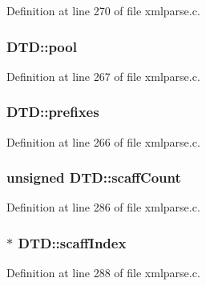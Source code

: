 Definition at line 270 of file xmlparse.\+c.

\subsubsection[{\texorpdfstring{pool}{pool}}]{ D\+T\+D\+::pool}\hypertarget{struct_d_t_d_ab33febd17f0cfde7df39438cabdffa6e}{}\label{struct_d_t_d_ab33febd17f0cfde7df39438cabdffa6e}


Definition at line 267 of file xmlparse.\+c.

\subsubsection[{\texorpdfstring{prefixes}{prefixes}}]{ D\+T\+D\+::prefixes}\hypertarget{struct_d_t_d_ad00dc50e4fb01b3013d902502f6932e3}{}\label{struct_d_t_d_ad00dc50e4fb01b3013d902502f6932e3}


Definition at line 266 of file xmlparse.\+c.

\subsubsection[{\texorpdfstring{scaff\+Count}{scaffCount}}]{\setlength{\rightskip}{0pt plus 5cm}unsigned D\+T\+D\+::scaff\+Count}\hypertarget{struct_d_t_d_af2f963a74af5574dfbb80b3529c023a8}{}\label{struct_d_t_d_af2f963a74af5574dfbb80b3529c023a8}


Definition at line 286 of file xmlparse.\+c.

\subsubsection[{\texorpdfstring{scaff\+Index}{scaffIndex}}]{$\ast$ D\+T\+D\+::scaff\+Index}\hypertarget{struct_d_t_d_a4bc4523f86658647920aaf827eb1ecdd}{}\label{struct_d_t_d_a4bc4523f86658647920aaf827eb1ecdd}


Definition at line 288 of file xmlparse.\+c.

